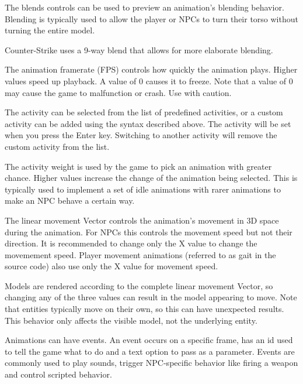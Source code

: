 \documentclass[10pt, a4paper, titlepage, oneside]{article}
\begin{document}
\vspace{\baselineskip}
The blends controls can be used to preview an animation's blending behavior. Blending is typically used to allow the player or NPCs to turn their torso without turning the entire model.

\vspace{\baselineskip}
Counter-Strike uses a 9-way blend that allows for more elaborate blending.

\vspace{\baselineskip}
The animation framerate (FPS) controls how quickly the animation plays. Higher values speed up playback. A value of 0 causes it to freeze. Note that a value of 0 may cause the game to malfunction or crash. Use with caution.

\vspace{\baselineskip}
The activity can be selected from the list of predefined activities, or a custom activity can be added using the syntax described above. The activity will be set when you press the Enter key. Switching to another activity will remove the custom activity from the list.

\vspace{\baselineskip}
The activity weight is used by the game to pick an animation with greater chance. Higher values increase the change of the animation being selected. This is typically used to implement a set of idle animations with rarer animations to make an NPC behave a certain way.

\vspace{\baselineskip}
The linear movement Vector controls the animation's movement in 3D space during the animation. For NPCs this controls the movement speed but not their direction. It is recommended to change only the X value to change the movemement speed. Player movement animations (referred to as gait in the source code) also use only the X value for movement speed.

\vspace{\baselineskip}
Models are rendered according to the complete linear movement Vector, so changing any of the three values can result in the model appearing to move. Note that entities typically move on their own, so this can have unexpected results. This behavior only affects the visible model, not the underlying entity.

\vspace{\baselineskip}
Animations can have events. An event occurs on a specific frame, has an id used to tell the game what to do and a text option to pass as a parameter.
Events are commonly used to play sounds, trigger NPC-specific behavior like firing a weapon and control scripted behavior.
\end{document}
